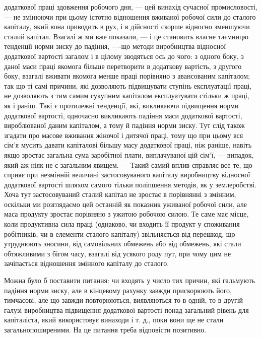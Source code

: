 \parcont{}  %
додаткової праці здовження робочого дня, — цей винахід сучасної промисловості, — не змінюючи при
цьому істотно відношення вживаної робочої сили до сталого капіталу, який вона приводить в рух, і в
дійсності скорше відносно зменшуючи сталий капітал. Взагалі ж ми вже показали, — і це становить
власне таємницю тенденції норми зиску до падіння, —-що методи виробництва відносної додаткової
вартості загалом і в цілому зводяться ось до чого: з одного боку, з даної маси праці якомога більше
перетворити в додаткову вартість, з другого боку, взагалі вживати якомога менше праці порівняно з
авансованим капіталом; так що ті самі причини, які дозволяють підвищувати ступінь експлуатації
праці, не дозволяють з тим самим сукупним капіталом експлуатувати стільки ж праці, як і раніш. Такі
є протилежні тенденції, які, викликаючи підвищення норми додаткової вартості, одночасно викликають
падіння маси додаткової вартості, вироблюваної даним капіталом, а тому й падіння норми зиску. Тут
слід також згадати про масове вживання жіночої і дитячої праці, тому що при цьому вся сім’я мусить
давати капіталові більшу масу додаткової праці, ніж раніше, навіть якщо зростає загальна сума
заробітної плати, виплачуваної цій сім’ї, — випадок, який аж ніяк не є загальним явищем. — Такий
самий вплив справляє все те, що сприяє при незмінній величині застосовуваного капіталу виробництву
відносної додаткової вартості шляхом самого тільки поліпшення методів, як у землеробстві. Хоча тут
застосовуваний сталий капітал не зростає в порівнянні з змінним, оскільки ми розглядаємо цей
останній як показник уживаної робочої сили, але маса продукту зростає порівняно з ужитою робочою
силою. Те саме має місце, коли продуктивна сила праці (однаково, чи входить її продукт у споживання
робітників, чи в елементи сталого капіталу) звільняється від перешкод, що утруднюють зносини, від
самовільних обмежень або від обмежень, які стали обтяжливими з бігом часу, взагалі від усякого роду
пут, при чому цим не зачіпається відношення змінного капіталу до сталого.

Можна було б поставити питання: чи входять у число тих причин, які гальмують падіння норми зиску,
але в кінцевому рахунку завжди прискорюють його, тимчасові, але що завжди повторюються, виявляються
то в одній, то в другій галузі виробництва підвищення додаткової вартості понад загальний рівень для
капіталіста, який використовує винаходи і т. д., поки вони ще не стали загальнопоширеними. На це
питання треба відповісти позитивно.

